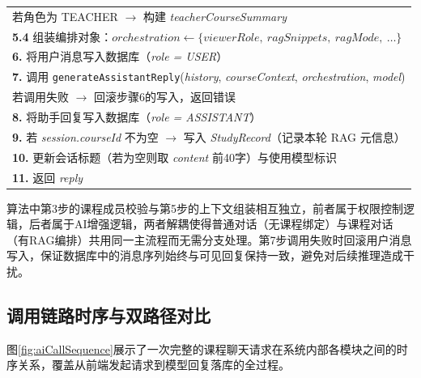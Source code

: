\documentclass[12pt,a4paper,oneside]{ctexbook}
\numberwithin{equation}{chapter}
\begin{document}
\begin{table}[H]
\begin{tabular}{p{13.5cm}}
\qquad 若角色为 TEACHER $\rightarrow$ 构建 \textit{teacherCourseSummary} \\
\quad \textbf{5.4} 组装编排对象：$orchestration \leftarrow \{viewerRole,\ ragSnippets,\ ragMode,\ \ldots\}$ \\[4pt]
\textbf{6.} 将用户消息写入数据库（\textit{role = USER}） \\[4pt]
\textbf{7.} 调用 \texttt{generateAssistantReply}(\textit{history}, \textit{courseContext}, \textit{orchestration}, \textit{model}) \\
\quad 若调用失败 $\rightarrow$ 回滚步骤6的写入，返回错误 \\[4pt]
\textbf{8.} 将助手回复写入数据库（\textit{role = ASSISTANT}） \\[4pt]
\textbf{9.} 若 \textit{session.courseId} 不为空 $\rightarrow$ 写入 \textit{StudyRecord}（记录本轮 RAG 元信息） \\[4pt]
\textbf{10.} 更新会话标题（若为空则取 \textit{content} 前40字）与使用模型标识 \\[4pt]
\textbf{11.} 返回 \textit{reply} \\
\bottomrule
\end{tabular}
\end{table}

算法中第3步的课程成员校验与第5步的上下文组装相互独立，前者属于权限控制逻辑，后者属于AI增强逻辑，两者解耦使得普通对话（无课程绑定）与课程对话（有RAG编排）共用同一主流程而无需分支处理。第7步调用失败时回滚用户消息写入，保证数据库中的消息序列始终与可见回复保持一致，避免对后续推理造成干扰。

\subsection{调用链路时序与双路径对比}

图\ref{fig:aiCallSequence}展示了一次完整的课程聊天请求在系统内部各模块之间的时序关系，覆盖从前端发起请求到模型回复落库的全过程。
\end{document}
